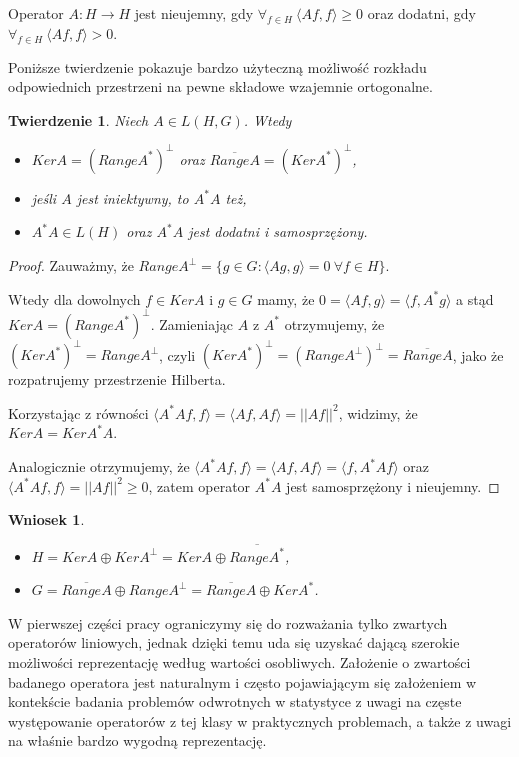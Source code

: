\documentclass{article}
\newtheorem{tw}{Twierdzenie}
\newtheorem{wn}{Wniosek}
\begin{document}
Operator $A\colon H\to H$ jest nieujemny, gdy $\forall_{f\in H}\ \langle Af,f\rangle\geq 0$ oraz dodatni, gdy $\forall_{f\in H}\ \langle Af,f\rangle> 0$.

Poniższe twierdzenie pokazuje bardzo użyteczną możliwość rozkładu odpowiednich przestrzeni na pewne składowe wzajemnie ortogonalne.

\begin{tw}
Niech $A\in L(H,G)$. Wtedy
\begin{itemize}
\item $KerA=(RangeA^*)^{\perp}$ oraz $\overline{RangeA}=(KerA^*)^{\perp}$,
\item jeśli $A$ jest iniektywny, to $A^*A$ też,
\item $A^*A\in L(H)$ oraz $A^*A$ jest dodatni i samosprzężony.
\end{itemize}
\end{tw}
\begin{proof}
Zauważmy, że $RangeA^{\perp}=\{g\in G\colon \langle Ag,g\rangle =0\ \forall f\in H\}$.

Wtedy dla dowolnych $f\in KerA$ i $g\in G$ mamy, że $0=\langle Af,g\rangle=\langle f,A^*g\rangle$ a stąd $KerA=(RangeA^*)^{\perp}$. Zamieniając $A$ z $A^*$ otrzymujemy, że $(KerA^*)^{\perp}=RangeA^{\perp}$, czyli $(KerA^*)^{\perp}=(RangeA^{\perp})^{\perp}=\overline{RangeA}$, jako że rozpatrujemy przestrzenie Hilberta.

Korzystając z równości $\langle A^*Af,f\rangle=\langle Af,Af\rangle=||Af||^2$, widzimy, że $KerA=KerA^*A$.

Analogicznie otrzymujemy, że $\langle A^*Af,f\rangle=\langle Af,Af\rangle=\langle f, A^*Af\rangle$ oraz $\langle A^*Af, f\rangle=||Af||^2\geq 0$, zatem operator $A^*A$ jest samosprzężony i nieujemny.
\end{proof}
\begin{wn}
\begin{itemize}
\item $H=KerA \oplus KerA^{\perp}=KerA\oplus \overline{RangeA^*}$,
\item $G=\overline{RangeA}\oplus RangeA^{\perp}=\overline{RangeA}\oplus KerA^*$.
\end{itemize}
\end{wn}

W pierwszej części pracy ograniczymy się do rozważania tylko zwartych operatorów liniowych, jednak dzięki temu uda się uzyskać dającą szerokie możliwości reprezentację według wartości osobliwych. Założenie o zwartości badanego operatora jest naturalnym i często pojawiającym się założeniem w kontekście badania problemów odwrotnych w statystyce z uwagi na częste występowanie operatorów z tej klasy w praktycznych problemach, a także z uwagi na właśnie bardzo wygodną reprezentację. 
\end{document}
